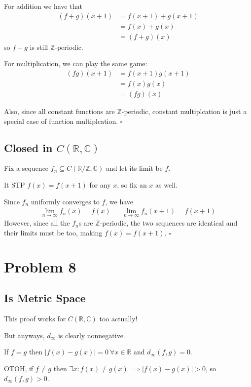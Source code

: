 \documentclass[12pt]{article}
\newcommand{\R}{\mathbb{R}}
\newcommand{\Z}{\mathbb{Z}}
\newcommand{\C}{\mathbb{C}}
\begin{document}
For addition we have that
\begin{align*}
  (f+g)(x+1)
   & = f(x+1)+g(x+1) \\
   & = f(x)+g(x)     \\
   & = (f+g)(x)
\end{align*}
so $f+g$ is still $\Z$-periodic.

For multiplication, we can play the same game:
\begin{align*}
  (fg)(x+1)
   & = f(x+1)g(x+1) \\
   & = f(x)g(x)     \\
   & = (fg)(x)
\end{align*}

Also, since all constant functions are $\Z$-periodic,
constant multiplcation is just a special case of function multiplcation. $\square$

\pagebreak

\subsection{Closed in \texorpdfstring{$C(\R, \C)$}{C(R, C)}}

Fix a sequence $f_n \subseteq C(\R/\Z, \C)$ and let its limit be $f$.

It STP $f(x)=f(x+1)$ for any $x$, so fix an $x$ as well.

Since $f_n$ uniformly converges to $f$, we have
\begin{align*}
  \lim_{n \to \infty} f_n(x)=f(x) && \lim_{n \to \infty} f_n(x+1)=f(x+1)
\end{align*}
However, since all the $f_n$s are $\Z$-periodic,
the two sequences are identical and their limits must be too, making $f(x)=f(x+1)$. $\square$

\section{Problem 8}

\subsection{Is Metric Space}

This proof works for $C(\R, \C)$ too actually!

But anyways, $d_\infty$ is clearly nonnegative.

If $f=g$ then $|f(x)-g(x)|=0\ \forall x \in \R$ and $d_\infty(f, g)=0$.

OTOH, if $f \ne g$ then $\exists x: f(x) \ne g(x) \implies |f(x)-g(x)| > 0$, so $d_\infty(f, g) > 0$.
\end{document}
